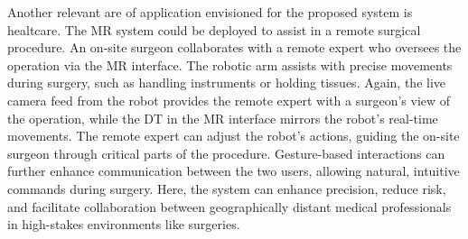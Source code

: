 Another relevant are of application envisioned for the proposed system is healtcare. The \ac{MR} system could be deployed to assist in a remote surgical procedure. An on-site surgeon collaborates with a remote expert who oversees the operation via the \ac{MR} interface. The robotic arm assists with precise movements during surgery, such as handling instruments or holding tissues. Again, the live camera feed from the robot provides the remote expert with a surgeon’s view of the operation, while the \ac{DT} in the \ac{MR} interface mirrors the robot's real-time movements. The remote expert can adjust the robot’s actions, guiding the on-site surgeon through critical parts of the procedure. Gesture-based interactions can further enhance communication between the two users, allowing natural, intuitive commands during surgery. Here, the system can enhance precision, reduce risk, and facilitate collaboration between geographically distant medical professionals in high-stakes environments like surgeries.












